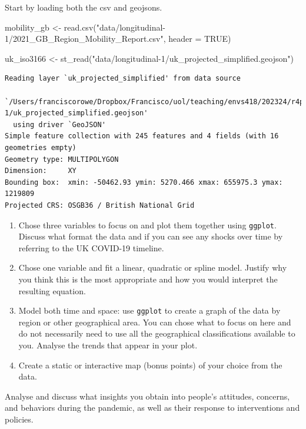 \documentclass[
  letterpaper,
  DIV=11,
  numbers=noendperiod]{scrreprt}
\newenvironment{Shaded}{\begin{snugshade}}{\end{snugshade}}
\newcommand{\AttributeTok}[1]{\textcolor[rgb]{0.40,0.45,0.13}{#1}}
\newcommand{\ConstantTok}[1]{\textcolor[rgb]{0.56,0.35,0.01}{#1}}
\newcommand{\FunctionTok}[1]{\textcolor[rgb]{0.28,0.35,0.67}{#1}}
\newcommand{\NormalTok}[1]{\textcolor[rgb]{0.00,0.23,0.31}{#1}}
\newcommand{\OtherTok}[1]{\textcolor[rgb]{0.00,0.23,0.31}{#1}}
\newcommand{\StringTok}[1]{\textcolor[rgb]{0.13,0.47,0.30}{#1}}
\begin{document}
Start by loading both the csv and geojsons.

\begin{Shaded}
\begin{Highlighting}[]
\NormalTok{mobility\_gb }\OtherTok{\textless{}{-}} \FunctionTok{read.csv}\NormalTok{(}\StringTok{"data/longitudinal{-}1/2021\_GB\_Region\_Mobility\_Report.csv"}\NormalTok{, }\AttributeTok{header =} \ConstantTok{TRUE}\NormalTok{)}

\NormalTok{uk\_iso3166 }\OtherTok{\textless{}{-}} \FunctionTok{st\_read}\NormalTok{(}\StringTok{"data/longitudinal{-}1/uk\_projected\_simplified.geojson"}\NormalTok{)}
\end{Highlighting}
\end{Shaded}

\begin{verbatim}
Reading layer `uk_projected_simplified' from data source 
  `/Users/franciscorowe/Dropbox/Francisco/uol/teaching/envs418/202324/r4ps/data/longitudinal-1/uk_projected_simplified.geojson' 
  using driver `GeoJSON'
Simple feature collection with 245 features and 4 fields (with 16 geometries empty)
Geometry type: MULTIPOLYGON
Dimension:     XY
Bounding box:  xmin: -50462.93 ymin: 5270.466 xmax: 655975.3 ymax: 1219809
Projected CRS: OSGB36 / British National Grid
\end{verbatim}

\begin{enumerate}
\def\labelenumi{\arabic{enumi}.}
\item
  Chose three variables to focus on and plot them together using
  \texttt{ggplot}. Discuss what format the data and if you can see any
  shocks over time by referring to the UK COVID-19 timeline.
\item
  Chose one variable and fit a linear, quadratic or spline model.
  Justify why you think this is the most appropriate and how you would
  interpret the resulting equation.
\item
  Model both time and space: use \texttt{ggplot} to create a graph of
  the data by region or other geographical area. You can chose what to
  focus on here and do not necessarily need to use all the geographical
  classifications available to you. Analyse the trends that appear in
  your plot.
\item
  Create a static or interactive map (bonus points) of your choice from
  the data.
\end{enumerate}

Analyse and discuss what insights you obtain into people's attitudes,
concerns, and behaviors during the pandemic, as well as their response
to interventions and policies.
\end{document}
